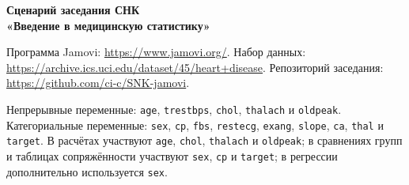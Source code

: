 \documentclass[11pt,a4paper]{article}
\newcommand{\JamoviURL}{https://www.jamovi.org/}
\newcommand{\DataURL}{https://archive.ics.uci.edu/dataset/45/heart+disease}
\newcommand{\RepoURL}{https://github.com/ci-c/SNK-jamovi}
\begin{document}
\begin{center}
{\Large\bfseries Сценарий заседания СНК\\
«Введение в медицинскую статистику»}
\end{center}


\begin{tcolorbox}[title={Ссылки для скачивания}]
Программа Jamovi: \url{\JamoviURL}. Набор данных: \url{\DataURL}.
Репозиторий заседания: \url{\RepoURL}.
\end{tcolorbox}

\begin{tcolorbox}[title={Переменные, с которыми работаем}]
Непрерывные переменные: \texttt{age}, \texttt{trestbps}, \texttt{chol}, \texttt{thalach} и \texttt{oldpeak}. Категориальные переменные: \texttt{sex}, \texttt{cp}, \texttt{fbs}, \texttt{restecg}, \texttt{exang}, \texttt{slope}, \texttt{ca}, \texttt{thal} и \texttt{target}. В расчётах участвуют \texttt{age}, \texttt{chol}, \texttt{thalach} и \texttt{oldpeak}; в сравнениях групп и таблицах сопряжённости участвуют \texttt{sex}, \texttt{cp} и \texttt{target}; в регрессии дополнительно используется \texttt{sex}.
\end{tcolorbox}
\end{document}
